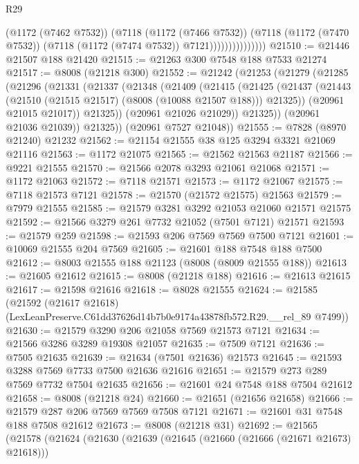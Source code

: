 \begin{lexlean}{R29}
\begin{coremodule}
                            (@1172 (@7462 @7532))
                            (@7118
                              (@1172 (@7466 @7532))
                              (@7118
                                (@1172 (@7470 @7532))
                                (@7118 (@1172 (@7474 @7532)) @7121)))))))))))))))
@21510 := @21446 @21507 @188 @21420
@21515 := @21263 @300 @7548 @188 @7533 @21274
@21517 := @8008 (@21218 @300)
@21552 := @21242
    (@21253
      (@21279
        (@21285
          (@21296
            (@21331
              (@21337
                (@21348
                  (@21409
                    (@21415
                      (@21425
                        (@21437
                          (@21443 (@21510 (@21515 @21517) (@8008 (@10088 @21507 @188))) @21325))
                        (@20961 @21015 @21017))
                      @21325))
                  (@20961 @21026 @21029))
                @21325))
            (@20961 @21036 @21039))
          @21325))
      (@20961 @7527 @21048))
@21555 := @7828 (@8970 @21240) @21232
@21562 := @21154 @21555 @38 @125 @3294 @3321 @21069 @21116
@21563 := @1172 @21075
@21565 := @21562 @21563 @21187
@21566 := @9221 @21555
@21570 := @21566 @2078 @3293 @21061 @21068
@21571 := @1172 @21063
@21572 := @7118 @21571
@21573 := @1172 @21067
@21575 := @7118 @21573 @7121
@21578 := @21570 (@21572 @21575) @21563
@21579 := @7979 @21555
@21585 := @21579 @3281 @3292 @21053 @21060 @21571 @21575
@21592 := @21566 @3279 @261 @7732 @21052 (@7501 @7121) @21571
@21593 := @21579 @259
@21598 := @21593 @206 @7569 @7569 @7500 @7121
@21601 := @10069 @21555 @204 @7569
@21605 := @21601 @188 @7548 @188 @7500
@21612 := @8003 @21555 @188 @21123 (@8008 (@8009 @21555 @188))
@21613 := @21605 @21612
@21615 := @8008 (@21218 @188)
@21616 := @21613 @21615
@21617 := @21598 @21616
@21618 := @8028 @21555
@21624 := @21585
    (@21592 (@21617 @21618) (LexLeanPreserve.C61dd37626d14b7b0e9174a43878fb572.R29.__rel_89 @7499))
@21630 := @21579 @3290 @206 @21058 @7569 @21573 @7121
@21634 := @21566 @3286 @3289 @19308 @21057
@21635 := @7509 @7121
@21636 := @7505 @21635
@21639 := @21634 (@7501 @21636) @21573
@21645 := @21593 @3288 @7569 @7733 @7500 @21636 @21616
@21651 := @21579 @273 @289 @7569 @7732 @7504 @21635
@21656 := @21601 @24 @7548 @188 @7504 @21612
@21658 := @8008 (@21218 @24)
@21660 := @21651 (@21656 @21658)
@21666 := @21579 @287 @206 @7569 @7569 @7508 @7121
@21671 := @21601 @31 @7548 @188 @7508 @21612
@21673 := @8008 (@21218 @31)
@21692 := @21565
    (@21578
      (@21624
        (@21630
          (@21639
            (@21645 (@21660 (@21666 (@21671 @21673) @21618)))

\end{coremodule}
\end{lexlean}
